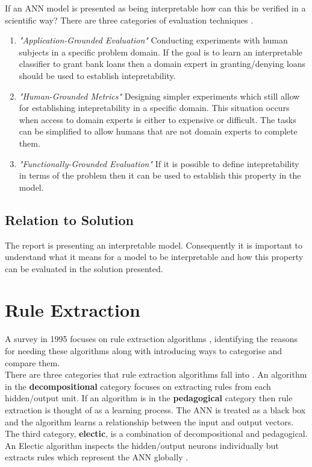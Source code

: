 If an ANN model is presented as being interpretable how can this be verified in a scientific way? There are three categories of evaluation techniques \cite{doshi2017towards}.
\begin{enumerate}
	\item \textit{"Application-Grounded Evaluation"} Conducting experiments with human subjects in a specific problem domain. If the goal is to learn an interpretable classifier to grant bank loans then a domain expert in granting/denying loans should be used to establish intepretability.
	
	\item \textit{"Human-Grounded Metrics"} Designing simpler experiments which still allow for establishing intepretability in a specific domain. This situation occurs when access to domain experts is either to expensive or difficult. The tasks can be simplified to allow humans that are not domain experts to complete them.
	
	\item \textit{"Functionally-Grounded Evaluation"} If it is possible to define intepretability in terms of the problem then it can be used to establish this property in the model.
\end{enumerate}

\subsection{Relation to Solution}
The report is presenting an interpretable model. Consequently it is important to understand what it means for a model to be interpretable and how this property can be evaluated in the solution presented.


\section{Rule Extraction}

A survey in 1995 focuses on rule extraction algorithms \cite{andrews1995survey}, identifying the reasons for needing these algorithms along with introducing ways to categorise and compare them.\\

There are three categories that rule extraction algorithms fall into \cite{andrews1995survey}. An algorithm in the \textbf{decompositional} category focuses on extracting rules from each hidden/output unit. If an algorithm is in the \textbf{pedagogical} category then rule extraction is thought of as a learning process. The ANN is treated as a black box and the algorithm learns a relationship between the input and output vectors. The third category, \textbf{electic}, is a combination of decompositional and pedagogical. An Electic algorithm inspects the hidden/output neurons individually but extracts rules which represent the ANN globally \cite{tickle1998truth}.\\

